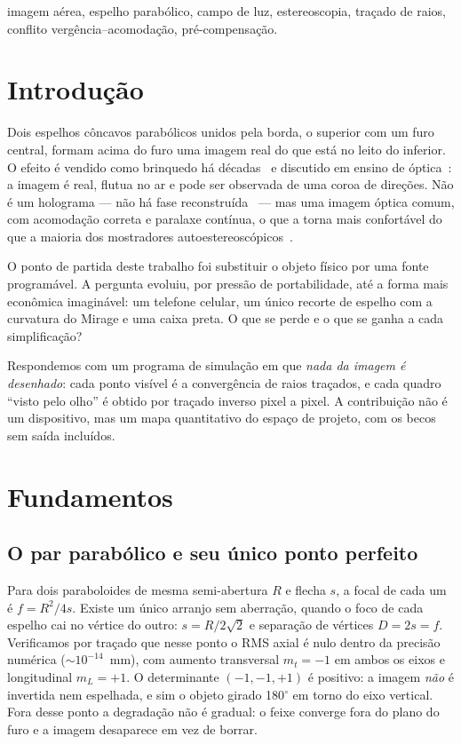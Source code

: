 \documentclass[journal,10pt]{IEEEtran}
\begin{document}
\begin{IEEEkeywords}
imagem a\'erea, espelho parab\'olico, campo de luz, estereoscopia, tra\c{c}ado de raios, conflito verg\^encia--acomoda\c{c}\~ao, pr\'e-compensa\c{c}\~ao.
\end{IEEEkeywords}

\section{Introdu\c{c}\~ao}
Dois espelhos c\^oncavos parab\'olicos unidos pela borda, o superior com um furo central, formam acima do furo uma imagem real do que est\'a no leito do inferior. O efeito \'e vendido como brinquedo h\'a d\'ecadas~\cite{optigone} e discutido em ensino de \'optica~\cite{etop2015}: a imagem \'e real, flutua no ar e pode ser observada de uma coroa de dire\c{c}\~oes. N\~ao \'e um holograma --- n\~ao h\'a fase reconstru\'ida~\cite{bornwolf1999} --- mas uma imagem \'optica comum, com acomoda\c{c}\~ao correta e paralaxe cont\'inua, o que a torna mais confort\'avel do que a maioria dos mostradores autoestereosc\'opicos~\cite{dodgson2005,hoffman2008}.

O ponto de partida deste trabalho foi substituir o objeto f\'isico por uma fonte program\'avel. A pergunta evoluiu, por press\~ao de portabilidade, at\'e a forma mais econ\^omica imagin\'avel: um telefone celular, um \'unico recorte de espelho com a curvatura do Mirage e uma caixa preta. O que se perde e o que se ganha a cada simplifica\c{c}\~ao?

Respondemos com um programa de simula\c{c}\~ao em que \emph{nada da imagem \'e desenhado}: cada ponto vis\'ivel \'e a converg\^encia de raios tra\c{c}ados, e cada quadro ``visto pelo olho'' \'e obtido por tra\c{c}ado inverso pixel a pixel. A contribui\c{c}\~ao n\~ao \'e um dispositivo, mas um mapa quantitativo do espa\c{c}o de projeto, com os becos sem sa\'ida inclu\'idos.

\section{Fundamentos}
\subsection{O par parab\'olico e seu \'unico ponto perfeito}
Para dois paraboloides de mesma semi-abertura $R$ e flecha $s$, a focal de cada um \'e $f = R^2/4s$. Existe um \'unico arranjo sem aberra\c{c}\~ao, quando o foco de cada espelho cai no v\'ertice do outro: $s = R/2\sqrt{2}$ e separa\c{c}\~ao de v\'ertices $D = 2s = f$. Verificamos por tra\c{c}ado que nesse ponto o RMS axial \'e nulo dentro da precis\~ao num\'erica ($\sim10^{-14}$~mm), com aumento transversal $m_t = -1$ em ambos os eixos e longitudinal $m_L = +1$. O determinante $(-1,-1,+1)$ \'e positivo: a imagem \emph{n\~ao} \'e invertida nem espelhada, e sim o objeto girado 180$^\circ$ em torno do eixo vertical. Fora desse ponto a degrada\c{c}\~ao n\~ao \'e gradual: o feixe converge fora do plano do furo e a imagem desaparece em vez de borrar.
\end{document}
